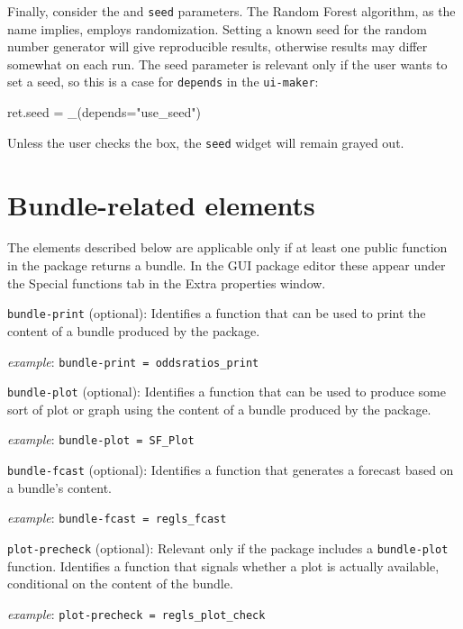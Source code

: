\documentclass[oneside]{book}
\newcommand{\vbusage}[0]{\textit{example}: \quad}
\begin{document}
Finally, consider the  and \texttt{seed}
parameters. The Random Forest algorithm, as the name implies, employs
randomization. Setting a known seed for the random number generator
will give reproducible results, otherwise results may differ somewhat
on each run. The seed parameter is relevant only if the user wants to
set a seed, so this is a case for \texttt{depends} in the
\texttt{ui-maker}:
\begin{code}
ret.seed = _(depends="use_seed")
\end{code}
Unless the user checks the  box, the \texttt{seed}
widget will remain grayed out.

\section{Bundle-related elements}
\label{sec:spec-bundle}

The elements described below are applicable only if at least one
public function in the package returns a bundle. In the GUI package
editor these appear under the \textsf{Special functions} tab in the
\textsf{Extra properties} window.

\begin{description}

\item \texttt{bundle-print} (optional): Identifies a function that can
  be used to print the content of a bundle produced by the package.

  \vbusage{} \verb|bundle-print = oddsratios_print|

\item \texttt{bundle-plot} (optional): Identifies a function that can
  be used to produce some sort of plot or graph using the content of a
  bundle produced by the package.

  \vbusage{} \verb|bundle-plot = SF_Plot|

\item \texttt{bundle-fcast} (optional): Identifies a function that
  generates a forecast based on a bundle's content.

  \vbusage{} \verb|bundle-fcast = regls_fcast|

\item \texttt{plot-precheck} (optional): Relevant only if the package
  includes a \texttt{bundle-plot} function. Identifies a function that
  signals whether a plot is actually available, conditional on the
  content of the bundle.

  \vbusage{} \verb|plot-precheck = regls_plot_check|

\end{description}
\end{document}
